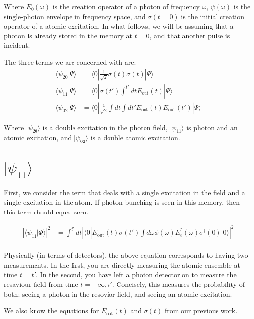 \documentclass[12pt]{article}
\begin{document}
Where $E_0(\omega)$ is the creation operator of a photon of frequency $\omega$, $\psi(\omega)$ is the single-photon envelope in frequency space, and $\sigma(t=0)$ is the initial creation operator of a atomic excitation. In what follows, we will be assuming that a photon is already stored in the memory at $t=0$, and that another pulse is incident.

The three terms we are concerned with are:
\begin{align}
\langle \psi_{20}| \Psi \rangle &=\langle 0 | \frac{1}{\sqrt{2}}\sigma (t)\sigma(t) | \Psi \rangle\\
\langle \psi_{11} | \Psi \rangle& =\langle 0 |  \sigma(t') \int^{t'} dt E_\textrm{out}(t) | \Psi \rangle\\
\langle \psi_{02} | \Psi \rangle &= \langle 0 |  \frac{1}{\sqrt{2}}\int dt \int dt' E_\textrm{out}(t) E_\textrm{out}(t') | \Psi \rangle
\end{align}

Where $| \psi_{20} \rangle$ is a double excitation in the photon field, $| \psi_{11} \rangle $ is photon and an atomic excitation, and $ | \psi_{02} \rangle $ is a double atomic excitation. 
\section{$| \psi_{11} \rangle$}
First, we consider the term that deals with a single excitation in the field and a single
excitation in the atom. If photon-bunching is seen in this memory, then this term should
equal zero.

\begin{align}
\left | \langle \psi_{11} | \Phi \rangle \right | ^2 &=\int^{t'} dt \left | \langle 0 | E_\textrm{out}(t) \sigma(t') \int d \omega \phi(\omega)E^\dagger_0(\omega)
\sigma^\dagger(0) | 0 \rangle \right |^2 \\
\end{align}

Physically (in terms of detectors), the above equation corresponds to having two measurements.
In the first, you are directly measuring the atomic ensemble at time $t=t'$.
In the second, you have left a photon detector on to measure the resaviour field from time $t={-\infty,t'}$.
Concisely, this measures the probability of both: seeing a photon in the resovior field, and seeing an atomic excitation.


We also know the equations for $E_\text{out} (t)$ and $\sigma (t)$ from our previous work.
\end{document}
